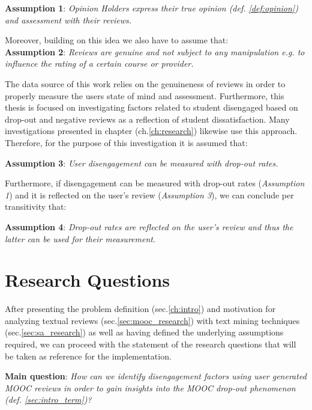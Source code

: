 \documentclass[
	a4paper,
	pdftex,
	12pt,	
	footinclude=true,
	fleqn,
	final,
	]{report}%
\begin{document}
\textbf{Assumption 1}: \emph{Opinion Holders express their true opinion 
(def. \ref{def:opinion}) and assessment with their reviews.}

Moreover, building on this idea we also have to assume that:\\
\textbf{Assumption 2}: \emph{Reviews are genuine and not subject to any manipulation e.g. 
to influence the rating of a certain course or provider.}

The data source of this work relies on the genuineness of reviews in order to 
properly measure the users state of mind and assessment.
Furthermore, this thesis is focused on investigating factors related to 
student disengaged based on drop-out and negative reviews as a 
reflection of student dissatisfaction. Many investigations presented in 
chapter (ch.\ref{ch:research}) likewise use this approach. 
Therefore, for the purpose of this investigation it is assumed that:

\textbf{Assumption 3}: \emph{User disengagement can be measured with drop-out rates.}

Furthermore, if disengagement can be measured with 
drop-out rates (\emph{Assumption 1}) and it is reflected 
on the user's review (\emph{Assumption 3}),
we can conclude per transitivity that:

\textbf{Assumption 4}: \emph{Drop-out rates are reflected on the user's review and
thus the latter can be used for their measurement}.

\vspace{-0.45cm}
\section{Research Questions}
\label{sec:res_questions}
\vspace{-0.3cm}

After presenting the problem definition (sec.\ref{ch:intro}) and 
motivation for analyzing textual reviews (sec.\ref{sec:mooc_research}) with text mining 
techniques (sec.\ref{sec:sa_research}) as well as having defined 
the underlying assumptions required, we can proceed with the 
statement of the research questions that will be taken as 
reference for the implementation.

\textbf{Main question}: \textit{How can we identify disengagement factors using 
user generated MOOC reviews in order to gain insights into the MOOC drop-out phenomenon
(def. \ref{sec:intro_term})?}
\end{document}
